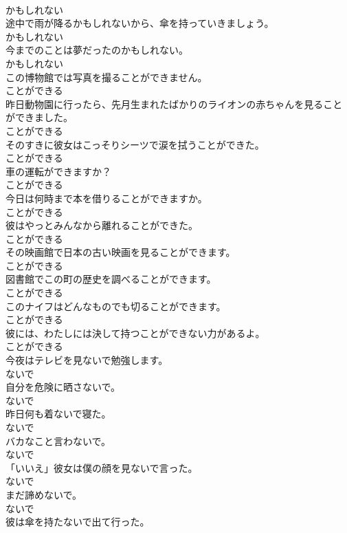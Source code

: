 \documentclass[8pt]{extreport}
\begin{document}
\begin{CJK}{UTF8}{min}
\\	かもしれない
\\	途中で雨が降るかもしれないから、傘を持っていきましょう。	
\\	かもしれない
\\	今までのことは夢だったのかもしれない。	
\\	かもしれない
\\	この博物館では写真を撮ることができません。	
\\	ことができる
\\	昨日動物園に行ったら、先月生まれたばかりのライオンの赤ちゃんを見ることができました。	
\\	ことができる
\\	そのすきに彼女はこっそりシーツで涙を拭うことができた。	
\\	ことができる
\\	車の運転ができますか？	
\\	ことができる
\\	今日は何時まで本を借りることができますか。	
\\	ことができる
\\	彼はやっとみんなから離れることができた。	
\\	ことができる
\\	その映画館で日本の古い映画を見ることができます。	
\\	ことができる
\\	図書館でこの町の歴史を調べることができます。	
\\	ことができる
\\	このナイフはどんなものでも切ることができます。	
\\	ことができる
\\	彼には、わたしには決して持つことができない力があるよ。	
\\	ことができる
\\	今夜はテレビを見ないで勉強します。	
\\	ないで
\\	自分を危険に晒さないで。	
\\	ないで
\\	昨日何も着ないで寝た。	
\\	ないで
\\	バカなこと言わないで。	
\\	ないで
\\	「いいえ」彼女は僕の顔を見ないで言った。	
\\	ないで
\\	まだ諦めないで。	
\\	ないで
\\	彼は傘を持たないで出て行った。	

\end{CJK}
\end{document}
